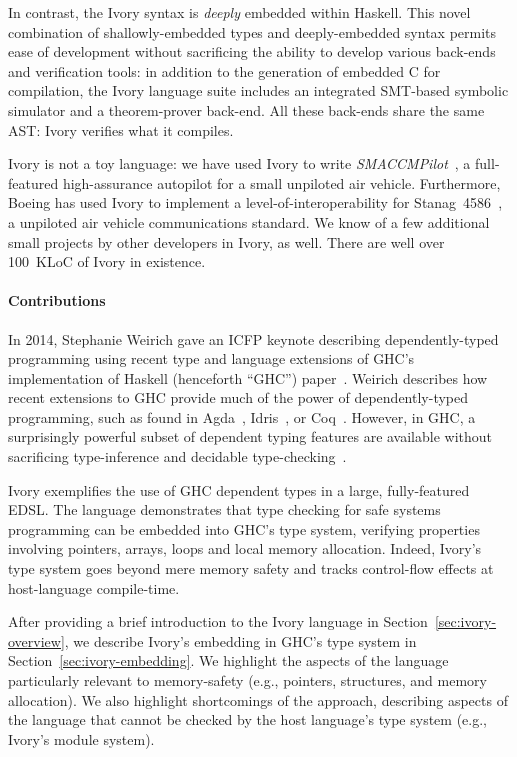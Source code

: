 In contrast, the Ivory syntax is \emph{deeply} embedded within
Haskell.  This novel combination of shallowly-embedded types and
deeply-embedded syntax permits ease of development without sacrificing
the ability to develop various back-ends and verification tools: in
addition to the generation of embedded C for compilation, the Ivory
language suite includes an integrated SMT-based symbolic simulator and
a theorem-prover back-end.  All these back-ends share the same AST:
Ivory verifies what it compiles.


Ivory is not a toy language: we have used Ivory to write
\emph{SMACCMPilot}~\cite{smaccm}, a full-featured high-assurance
autopilot for a small unpiloted air vehicle.  Furthermore, Boeing has
used Ivory to implement a level-of-interoperability for
Stanag~4586~\cite{stanag}, a unpiloted air vehicle communications
standard. We know of a few additional small projects by other
developers in Ivory, as well.  There are well over 100~KLoC of Ivory in existence.



\paragraph{Contributions}
In 2014, Stephanie Weirich gave an ICFP keynote describing dependently-typed programming
using recent type and language extensions of GHC's implementation of Haskell
(henceforth ``GHC'') paper~\cite{weirich-keynote}. Weirich describes how recent extensions to GHC
provide much of the power of dependently-typed programming, such as found in
Agda~\cite{agda}, Idris~\cite{idris}, or Coq~\cite{coq}. However, in GHC, a
surprisingly powerful subset of dependent typing features are
available without sacrificing type-inference and decidable type-checking~\cite{dephaskell}.

Ivory exemplifies the use of GHC dependent types in a large, fully-featured
EDSL. The language demonstrates that type checking for safe systems programming
can be embedded into GHC's type system, verifying properties involving
pointers, arrays, loops and local memory allocation. Indeed, Ivory's type
system goes beyond mere memory safety and tracks control-flow effects at host-language
compile-time.

After providing a brief introduction to the Ivory language in
Section~\ref{sec:ivory-overview}, we describe Ivory's embedding in GHC's type
system in Section~\ref{sec:ivory-embedding}. We highlight the aspects of the
language particularly relevant to memory-safety (e.g., pointers, structures, and
memory allocation). We also highlight shortcomings of the approach, describing
aspects of the language that cannot be checked by the host language's type
system (e.g., Ivory's module system).


